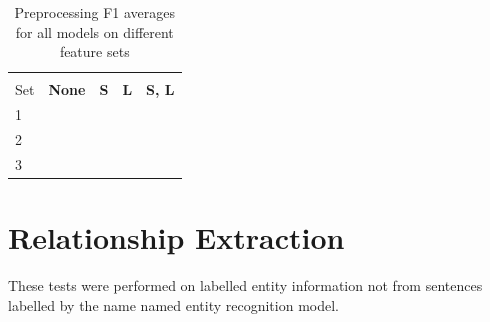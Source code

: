 \documentclass[11pt,oneside]{book}
\begin{document}
\begin{longtable}[c]{|l|l|l|l|l|}
\caption{Preprocessing F1 averages for all models on different feature sets}
\label{tab:ner_preprocessing}\\
\hline
\textbf{\begin{tabular}[c]{@{}l@{}}Feature \\ Set\end{tabular}} & \multicolumn{1}{c|}{\textbf{None}} & \multicolumn{1}{c|}{\textbf{S}} & \multicolumn{1}{c|}{\textbf{L}} & \multicolumn{1}{c|}{\textbf{S, L}} \\ \hline
\endfirsthead
%
\endhead
%
1                                                               & \multicolumn{1}{c|}{}              & \multicolumn{1}{c|}{}           &                                 &                                    \\ \hline
2                                                               &                                    &                                 &                                 &                                    \\ \hline
3                                                               &                                    &                                 &                                 &                                    \\ \hline
\end{longtable}

\section{Relationship Extraction}

These tests were performed on labelled entity information not from sentences labelled by the name named entity recognition model.
\end{document}
